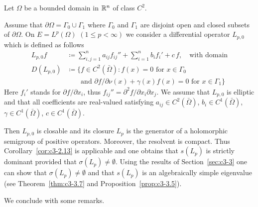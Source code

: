 \begin{example}\label{ex:c3-2.14}
	Let $\Omega$ be a bounded domain in $\mathbb{R} ^{n}$ of class $C^{2}$.
	
	Assume that $\partial\Omega = \Gamma_{0}\cup\Gamma_{1}$ where $\Gamma_{0}$ and $\Gamma_{1}$ are disjoint open and closed subsets of\/ $\partial\Omega$.
    On $E = L^{p}(\Omega)$ $(1 \leq p < \infty)$ we consider a differential operator $L_{p,0}$ which is defined as follows
\begin{equation}\label{eq:c3-2.23}
    \begin{split}
        L_{p,0}f &\coloneq \sum_{i,j=1}^{n} a_{ij} f_{ij}'' 
                  + \sum_{i=1}^{n} b_{i} f_{i}' + c\,f, 
                  \quad \text{with domain} \\
        D(L_{p,0}) &\coloneq \{f \in C^{2}(\bar{\Omega}) \colon 
                    f(x) = 0 \text{ for } x \in \Gamma_{0} \\
                   &\phantom{\coloneqq\{} \text{and } 
                    \partial f/\partial\nu(x) + \gamma(x)f(x) = 0 
                    \text{ for } x \in \Gamma_{1}\}
    \end{split}
\end{equation}
Here $f_{i}'$ stands for $\partial f/\partial x_{i}$, thus $f_{ij}'' = \partial^{2}f/\partial x_{i}\partial x_{j}$.
We assume that $L_{p,0}$ is elliptic and that all coefficients are real-valued satisfying $a_{ij} \in C^{2}(\bar{\Omega})$, $b_{i} \in C^{1}(\bar{\Omega})$, $\gamma \in C^{1}(\bar{\Omega})$, $c \in C^{1}(\bar{\Omega})$.

Then $L_{p,0}$ is closable and its closure $L_{p}$ is the generator of a holomorphic semigroup of positive operators.
Moreover, the resolvent is compact.
Thus Corollary~\ref{cor:c3-2.13} is applicable and one obtains that $s(L_{p})$ is strictly dominant provided that $\sigma(L_{p}) \neq \emptyset$.
Using the results of Section~\ref{sec:c3-3} one can show that $\sigma(L_{p}) \neq \emptyset$ and that $s(L_{p})$ is an algebraically simple eigenvalue (see Theorem~\ref{thm:c3-3.7} and Proposition~\ref{prop:c3-3.5}).
\end{example}
We conclude with some remarks.
